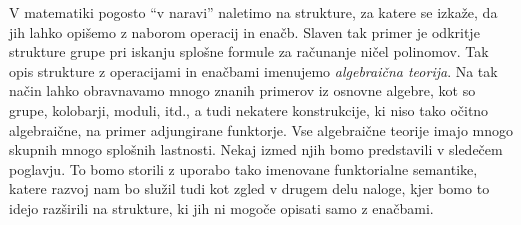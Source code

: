 \documentclass[../kategoricna_logika.tex]{subfiles}
\begin{document}
V matematiki pogosto "`v naravi"' naletimo na strukture, za katere se izkaže,
da jih lahko opišemo z naborom operacij in enačb.
Slaven tak primer je odkritje strukture grupe pri iskanju splošne formule
za računanje ničel polinomov.
Tak opis strukture z operacijami in enačbami imenujemo \emph{algebraična teorija}.
Na tak način lahko obravnavamo mnogo znanih primerov iz osnovne algebre,
kot so grupe, kolobarji, moduli, itd., a tudi nekatere konstrukcije, ki niso
tako očitno algebraične, na primer adjungirane funktorje.
Vse algebraične teorije imajo mnogo skupnih mnogo splošnih lastnosti.
Nekaj izmed njih bomo predstavili v sledečem poglavju.
To bomo storili z uporabo tako imenovane funktorialne semantike, katere
razvoj nam bo služil tudi kot zgled v drugem delu naloge, kjer bomo to
idejo razširili na strukture, ki jih ni mogoče opisati samo z enačbami.
\end{document}
